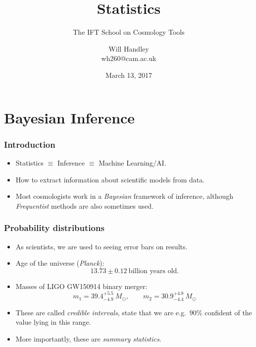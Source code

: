 \documentclass[%
]{beamer}
\title{Statistics}
\subtitle{The IFT School on Cosmology Tools}
\author[Handley] %
{Will Handley\\ \small{wh260@cam.ac.uk}}
\institute[University of Cambridge] %
{%
Astrophysics Group \\
Cavendish Laboratory \\
University of Cambridge
}
\date{March 13, 2017}
\begin{document}
\begin{frame}
  \titlepage
\end{frame}


\section{Bayesian Inference}
\begin{frame}
    \frametitle{Introduction}
    \begin{itemize}
        \pause\item Statistics $\equiv$ Inference \pause $\equiv$ Machine Learning/AI.
        \pause\item How to extract information about scientific models from data.
        \pause\item Most cosmologists work in a {\em Bayesian\/} framework of inference, although {\em Frequentist\/} methods are also sometimes used.
    \end{itemize}
\end{frame}

\begin{frame}
    \frametitle{Probability distributions}

    \begin{itemize}
        \pause\item As scientists, we are used to seeing error bars on results.
        \pause\item Age of the universe ({\em Planck\/}): 
        \pause \[13.73\pm 0.12\:\text{billion years old.}\]
        \pause\item Masses of LIGO GW150914 binary merger: 
        \[m_1 = 39.4^{+5.5}_{-4.9}\:M_\odot,\qquad m_2 = 30.9^{+4.8}_{-4.4}\:M_\odot \]
        \pause\item These are called {\em credible intervals}, state that we are e.g.\ $90\%$ confident of the value lying in this range.
        \pause\item More importantly, these are {\em summary statistics}.
    \end{itemize}
\end{frame}
\end{document}
